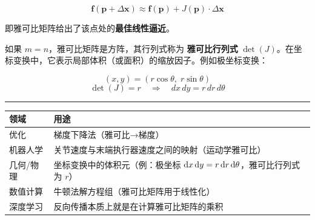 \[
\mathbf{f}(\mathbf{p} + \Delta \mathbf{x}) \approx \mathbf{f}(\mathbf{p}) + J(\mathbf{p}) \cdot \Delta \mathbf{x}
\]

即雅可比矩阵给出了该点处的\textbf{最佳线性逼近}。

\label{ux9762ux79efux4f53ux79efux4f38ux7f29ux5f53-m-n}

如果 \(m = n\)，雅可比矩阵是方阵，其行列式称为 \textbf{雅可比行列式}
\(\det(J)\)。在坐标变换中，它表示局部体积（或面积）的缩放因子。例如极坐标变换：

\[
(x, y) = (r\cos\theta,\; r\sin\theta)
\] \[
\det(J) = r \quad \Rightarrow \quad dx\,dy = r\,dr\,d\theta
\]

\begin{center}\rule{0.5\linewidth}{0.5pt}\end{center}

\label{ux7279ux6b8aux60c5ux5f62}


\begin{tabular}{|l|p{8cm}|}
\hline
\textbf{领域} & \textbf{用途} \\
\hline
优化 & 梯度下降法（雅可比→梯度） \\
\hline
机器人学 & 关节速度与末端执行器速度之间的映射（运动学雅可比） \\
\hline
几何/物理 & 坐标变换中的体积元（例：极坐标 $\mathop{}\!\mathrm{d}x\mathop{}\!\mathrm{d}y = r \mathop{}\!\mathrm{d}r \mathop{}\!\mathrm{d}\theta$，雅可比行列式为 $r$） \\
\hline
数值计算 & 牛顿法解方程组（雅可比矩阵用于线性化） \\
\hline
深度学习 & 反向传播本质上就是在计算雅可比矩阵的乘积 \\
\hline
\end{tabular}


